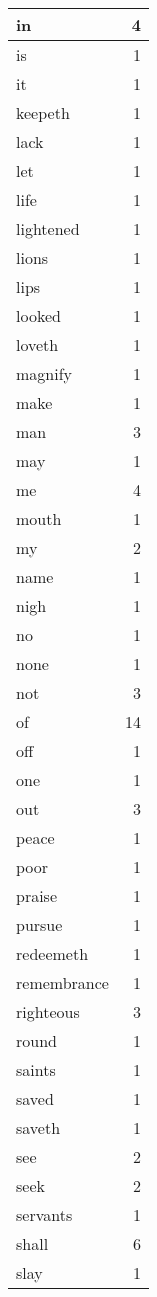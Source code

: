 \begin{center}
\begin{longtable}{l|r}
in & 4 \\ \hline
is & 1 \\ \hline
it & 1 \\ \hline
keepeth & 1 \\ \hline
lack & 1 \\ \hline
let & 1 \\ \hline
life & 1 \\ \hline
lightened & 1 \\ \hline
lions & 1 \\ \hline
lips & 1 \\ \hline
looked & 1 \\ \hline
loveth & 1 \\ \hline
magnify & 1 \\ \hline
make & 1 \\ \hline
man & 3 \\ \hline
may & 1 \\ \hline
me & 4 \\ \hline
mouth & 1 \\ \hline
my & 2 \\ \hline
name & 1 \\ \hline
nigh & 1 \\ \hline
no & 1 \\ \hline
none & 1 \\ \hline
not & 3 \\ \hline
of & 14 \\ \hline
off & 1 \\ \hline
one & 1 \\ \hline
out & 3 \\ \hline
peace & 1 \\ \hline
poor & 1 \\ \hline
praise & 1 \\ \hline
pursue & 1 \\ \hline
redeemeth & 1 \\ \hline
remembrance & 1 \\ \hline
righteous & 3 \\ \hline
round & 1 \\ \hline
saints & 1 \\ \hline
saved & 1 \\ \hline
saveth & 1 \\ \hline
see & 2 \\ \hline
seek & 2 \\ \hline
servants & 1 \\ \hline
shall & 6 \\ \hline
slay & 1 \\ \hline

\end{longtable}
\end{center}
